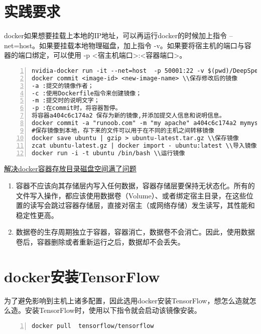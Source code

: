 \section{实践要求}
docker如果想要挂载上本地的IP地址，可以再运行docker的时候加上指令 --net=host。如果要挂载本地物理磁盘，加上指令 -v。如果要将宿主机的端口与容器的端口绑定，可以使用 -p <宿主机端口>:<容器端口>。
\begin{lstlisting}[language = shell, numbers=left, 
         numberstyle=\tiny,keywordstyle=\color{blue!70},
         commentstyle=\color{red!50!green!50!blue!50},frame=shadowbox,
         rulesepcolor=\color{red!20!green!20!blue!20},basicstyle=\ttfamily]
nvidia-docker run -it --net=host  -p 50001:22 -v $(pwd)/DeepSpeech:/DeepSpeech  -v /data1/asr_data:/mnt/data -v /data/kaldi/2019_0521_kaldi/kaldi-master:/mnt/kaldi duhu/ds-server /bin/bash
docker commit <image-id> <new-image-name> \\保存修改后的镜像
-a :提交的镜像作者；
-c :使用Dockerfile指令来创建镜像；
-m :提交时的说明文字；
-p :在commit时，将容器暂停。
将容器a404c6c174a2 保存为新的镜像,并添加提交人信息和说明信息。
docker commit -a "runoob.com" -m "my apache" a404c6c174a2 mymysql:v1
#保存镜像到本地，存下来的文件可以用于在不同的主机之间转移镜像
docker save ubuntu | gzip > ubuntu-latest.tar.gz \\保存镜像
zcat ubuntu-latest.gz | docker import - ubuntu:latest \\导入镜像
docker run -i -t ubuntu /bin/bash \\运行镜像

\end{lstlisting}

\href{https://juejin.im/post/5badee89e51d450e6160312a}{解决docker容器存放目录磁盘空间满了问题
}

\begin{enumerate}
  \item 容器不应该向其存储层内写入任何数据，容器存储层要保持无状态化。所有的文件写入操作，都应该使用数据卷（Volume）、或者绑定宿主目录，在这些位置的读写会跳过容器存储层，直接对宿主（或网络存储）发生读写，其性能和稳定性更高。
  \item 数据卷的生存周期独立于容器，容器消亡，数据卷不会消亡。因此，使用数据卷后，容器删除或者重新运行之后，数据却不会丢失。
\end{enumerate}

\section{docker安装TensorFlow}
为了避免影响到主机上诸多配置，因此选用docker安装TensorFlow，想怎么造就怎么造。安装TensorFlow时，使用以下指令就会启动该镜像安装。
\begin{lstlisting}[language = shell, numbers=left, 
         numberstyle=\tiny,keywordstyle=\color{blue!70},
         commentstyle=\color{red!50!green!50!blue!50},frame=shadowbox,
         rulesepcolor=\color{red!20!green!20!blue!20},basicstyle=\ttfamily]
docker pull  tensorflow/tensorflow
\end{lstlisting}